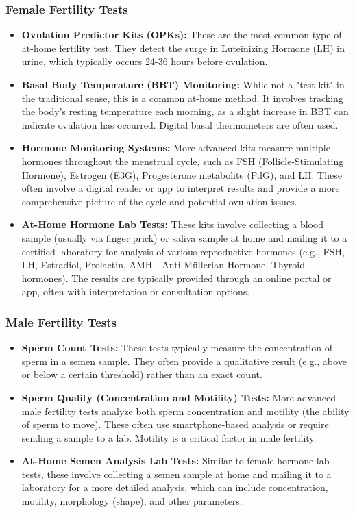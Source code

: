 \documentclass{article}
\begin{document}
\subsubsection{Female Fertility Tests}
\begin{itemize}
    \item \textbf{Ovulation Predictor Kits (OPKs):} These are the most common type of at-home fertility test. They detect the surge in Luteinizing Hormone (LH) in urine, which typically occurs 24-36 hours before ovulation.
    \item \textbf{Basal Body Temperature (BBT) Monitoring:} While not a "test kit" in the traditional sense, this is a common at-home method. It involves tracking the body's resting temperature each morning, as a slight increase in BBT can indicate ovulation has occurred. Digital basal thermometers are often used.
    \item \textbf{Hormone Monitoring Systems:} More advanced kits measure multiple hormones throughout the menstrual cycle, such as FSH (Follicle-Stimulating Hormone), Estrogen (E3G), Progesterone metabolite (PdG), and LH. These often involve a digital reader or app to interpret results and provide a more comprehensive picture of the cycle and potential ovulation issues.
    \item \textbf{At-Home Hormone Lab Tests:} These kits involve collecting a blood sample (usually via finger prick) or saliva sample at home and mailing it to a certified laboratory for analysis of various reproductive hormones (e.g., FSH, LH, Estradiol, Prolactin, AMH - Anti-Müllerian Hormone, Thyroid hormones). The results are typically provided through an online portal or app, often with interpretation or consultation options.
\end{itemize}

\subsubsection{Male Fertility Tests}
\begin{itemize}
    \item \textbf{Sperm Count Tests:} These tests typically measure the concentration of sperm in a semen sample. They often provide a qualitative result (e.g., above or below a certain threshold) rather than an exact count.
    \item \textbf{Sperm Quality (Concentration and Motility) Tests:} More advanced male fertility tests analyze both sperm concentration and motility (the ability of sperm to move). These often use smartphone-based analysis or require sending a sample to a lab. Motility is a critical factor in male fertility.
    \item \textbf{At-Home Semen Analysis Lab Tests:} Similar to female hormone lab tests, these involve collecting a semen sample at home and mailing it to a laboratory for a more detailed analysis, which can include concentration, motility, morphology (shape), and other parameters.
\end{itemize}
\end{document}
